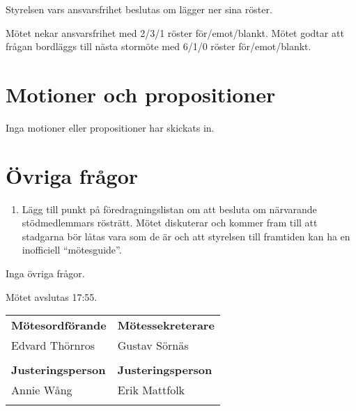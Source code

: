 \documentclass[a4paper]{article}
\begin{document}
Styrelsen vars ansvarsfrihet beslutas om lägger ner sina röster.

Mötet nekar ansvarsfrihet med 2/3/1 röster för/emot/blankt. Mötet godtar
att frågan bordläggs till nästa stormöte med 6/1/0 röster
för/emot/blankt.

\hypertarget{motioner-och-propositioner}{%
\section{Motioner och
propositioner}\label{motioner-och-propositioner}}

Inga motioner eller propositioner har skickats in.

\hypertarget{uxf6vriga-fruxe5gor}{%
\section{Övriga frågor}\label{uxf6vriga-fruxe5gor}}

\begin{enumerate}
\def\labelenumi{\arabic{enumi}.}
\item
  Lägg till punkt på föredragningslistan om att besluta om närvarande
  stödmedlemmars rösträtt. Mötet diskuterar och kommer fram till att
  stadgarna bör låtas vara som de är och att styrelsen till framtiden
  kan ha en inofficiell ``mötesguide''.
\end{enumerate}

Inga övriga frågor.

Mötet avslutas 17:55.

\vspace{2em}

\begin{tabular}{@{}p{}p{}@{}}
  \textbf{Mötesordförande} & \textbf{Mötessekreterare} \\[0.3em]
  Edvard Thörnros & Gustav Sörnäs \\
  \vspace{8em} &\\
  \textbf{Justeringsperson} & \textbf{Justeringsperson} \\[0.3em]
  Annie Wång & Erik Mattfolk \\
  \vspace{8em} &\\
\end{tabular}
\end{document}
